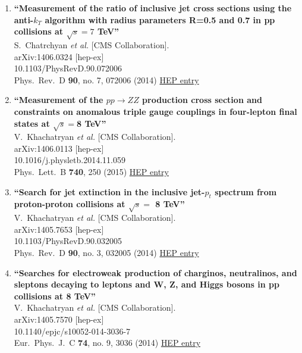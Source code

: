 \documentclass{article}
\begin{document}
\begin{enumerate}
\item%
{\bf ``Measurement of the ratio of inclusive jet cross sections using the anti-$k_T$ algorithm with radius parameters R=0.5 and 0.7 in pp collisions at $\sqrt{s}=7$  TeV''}
  \\{}S.~Chatrchyan {\it et al.} [CMS Collaboration].
  \\{}arXiv:1406.0324 [hep-ex]
    \\{}10.1103/PhysRevD.90.072006
\\{}Phys.\ Rev.\ D {\bf 90}, no. 7, 072006 (2014) %
\href{http://inspirehep.net/record/1298810}{HEP entry}


\item%
{\bf ``Measurement of the $pp \to ZZ$ production cross section and constraints on anomalous triple gauge couplings in four-lepton final states at $\sqrt s=$8 TeV''}
  \\{}V.~Khachatryan {\it et al.} [CMS Collaboration].
  \\{}arXiv:1406.0113 [hep-ex]
    \\{}10.1016/j.physletb.2014.11.059
\\{}Phys.\ Lett.\ B {\bf 740}, 250 (2015) %
\href{http://inspirehep.net/record/1298807}{HEP entry}


\item%
{\bf ``Search for jet extinction in the inclusive jet-$p_t$ spectrum from proton-proton collisions at $\sqrt s =$ 8 TeV''}
  \\{}V.~Khachatryan {\it et al.} [CMS Collaboration].
  \\{}arXiv:1405.7653 [hep-ex]
    \\{}10.1103/PhysRevD.90.032005
\\{}Phys.\ Rev.\ D {\bf 90}, no. 3, 032005 (2014) %
\href{http://inspirehep.net/record/1298512}{HEP entry}


\item%
{\bf ``Searches for electroweak production of charginos, neutralinos, and sleptons decaying to leptons and W, Z, and Higgs bosons in pp collisions at 8 TeV''}
  \\{}V.~Khachatryan {\it et al.} [CMS Collaboration].
  \\{}arXiv:1405.7570 [hep-ex]
    \\{}10.1140/epjc/s10052-014-3036-7
\\{}Eur.\ Phys.\ J.\ C {\bf 74}, no. 9, 3036 (2014) %
\href{http://inspirehep.net/record/1298508}{HEP entry}



\end{enumerate}
\end{document}
